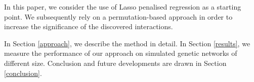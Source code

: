 In this paper, we consider the use of Lasso penalised regression as a starting point. We subsequently rely on a permutation-based approach in order to increase the significance of the discovered interactions. 

In Section \ref{approach}, we describe the method in detail. In Section \ref{results}, we measure the performance of our approach on simulated genetic networks of different size. Conclusion and future developments are drawn in Section \ref{conclusion}.




